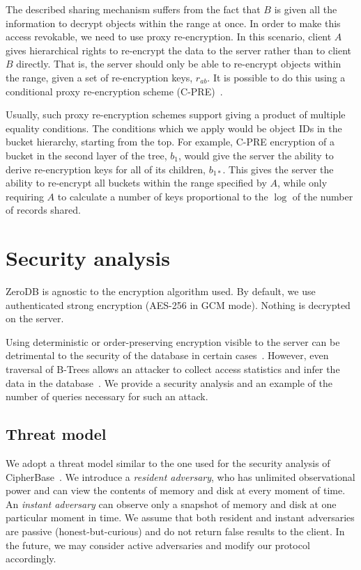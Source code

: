 \documentclass[notitlepage,longbibliography]{revtex4-1}
\begin{document}
The described sharing mechanism suffers from the fact that $B$ is given all the information to decrypt objects within the range at once.
In order to make this access revokable, we need to use proxy re-encryption.
In this scenario, client $A$ gives hierarchical rights to re-encrypt the data to the server rather than to client $B$ directly.
That is, the server should only be able to re-encrypt objects within the range, given a set of re-encryption keys, $r_{ab}$.
It is possible to do this using a conditional proxy re-encryption scheme (C-PRE)~\cite{conditional-pre-2009,unidirectional-pre-2010,conditional-pre-2014,hierarchical-pre}.

Usually, such proxy re-encryption schemes support giving a product of multiple equality conditions.
The conditions which we apply would be object IDs in the bucket hierarchy, starting from the top.
For example, C-PRE encryption of a bucket in the second layer of the tree, $b_1$, would give the server the ability to derive re-encryption keys for all of its children, $b_{1*}$.
This gives the server the ability to re-encrypt all buckets within the range specified by $A$, while only requiring $A$ to calculate a number of keys proportional to the $\log$ of the number of records shared.

\section{Security analysis}

ZeroDB is agnostic to the encryption algorithm used.
By default, we use authenticated strong encryption ({AES-256} in GCM mode).
Nothing is decrypted on the server.

Using deterministic or order-preserving encryption visible to the server can be detrimental to the security of the database in certain cases~\cite{cryptdb-hacked}.
However, even traversal of B-Trees allows an attacker to collect access statistics and infer the data in the database~\cite{access-pattern-attack}.
We provide a security analysis and an example of the number of queries necessary for such an attack.

\subsection{Threat model}

We adopt a threat model similar to the one used for the security analysis of CipherBase~\cite{cipherbase}.
We introduce a \emph{resident adversary}, who has unlimited observational power and can view the contents of memory and disk at every moment of time.
An \emph{instant adversary} can observe only a snapshot of memory and disk at one particular moment in time.
We assume that both resident and instant adversaries are passive (honest-but-curious) and do not return false results to the client.
In the future, we may consider active adversaries and modify our protocol accordingly.
\end{document}
